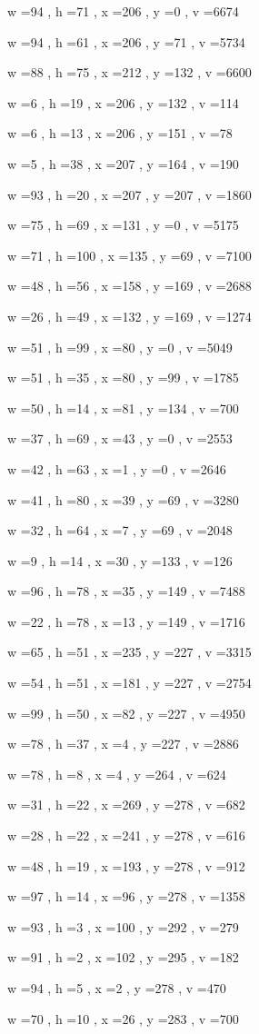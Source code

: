 \documentclass[11pt]{article}
\begin{document}
w =94 , h =71 , x =206 , y =0 , v =6674
\par
w =94 , h =61 , x =206 , y =71 , v =5734
\par
w =88 , h =75 , x =212 , y =132 , v =6600
\par
w =6 , h =19 , x =206 , y =132 , v =114
\par
w =6 , h =13 , x =206 , y =151 , v =78
\par
w =5 , h =38 , x =207 , y =164 , v =190
\par
w =93 , h =20 , x =207 , y =207 , v =1860
\par
w =75 , h =69 , x =131 , y =0 , v =5175
\par
w =71 , h =100 , x =135 , y =69 , v =7100
\par
w =48 , h =56 , x =158 , y =169 , v =2688
\par
w =26 , h =49 , x =132 , y =169 , v =1274
\par
w =51 , h =99 , x =80 , y =0 , v =5049
\par
w =51 , h =35 , x =80 , y =99 , v =1785
\par
w =50 , h =14 , x =81 , y =134 , v =700
\par
w =37 , h =69 , x =43 , y =0 , v =2553
\par
w =42 , h =63 , x =1 , y =0 , v =2646
\par
w =41 , h =80 , x =39 , y =69 , v =3280
\par
w =32 , h =64 , x =7 , y =69 , v =2048
\par
w =9 , h =14 , x =30 , y =133 , v =126
\par
w =96 , h =78 , x =35 , y =149 , v =7488
\par
w =22 , h =78 , x =13 , y =149 , v =1716
\par
w =65 , h =51 , x =235 , y =227 , v =3315
\par
w =54 , h =51 , x =181 , y =227 , v =2754
\par
w =99 , h =50 , x =82 , y =227 , v =4950
\par
w =78 , h =37 , x =4 , y =227 , v =2886
\par
w =78 , h =8 , x =4 , y =264 , v =624
\par
w =31 , h =22 , x =269 , y =278 , v =682
\par
w =28 , h =22 , x =241 , y =278 , v =616
\par
w =48 , h =19 , x =193 , y =278 , v =912
\par
w =97 , h =14 , x =96 , y =278 , v =1358
\par
w =93 , h =3 , x =100 , y =292 , v =279
\par
w =91 , h =2 , x =102 , y =295 , v =182
\par
w =94 , h =5 , x =2 , y =278 , v =470
\par
w =70 , h =10 , x =26 , y =283 , v =700
\par
\newpage
\end{document}
